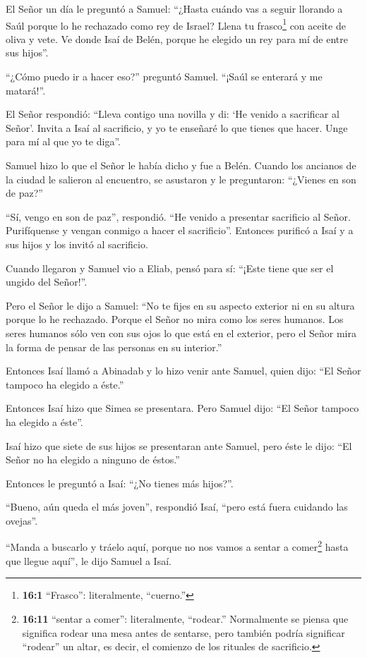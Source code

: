  El Señor un día le preguntó a Samuel: ``¿Hasta cuándo vas a
seguir llorando a Saúl porque lo he rechazado como rey de Israel? Llena
tu frasco\footnote{\textbf{16:1} ``Frasco'': literalmente, ``cuerno.''}
con aceite de oliva y vete. Ve donde Isaí de Belén, porque he elegido un
rey para mí de entre sus hijos''.

 ``¿Cómo puedo ir a hacer eso?'' preguntó Samuel. ``¡Saúl se
enterará y me matará!''.

El Señor respondió: ``Lleva contigo una novilla y di: `He venido a
sacrificar al Señor'.  Invita a Isaí al sacrificio, y yo te
enseñaré lo que tienes que hacer. Unge para mí al que yo te diga''.

 Samuel hizo lo que el Señor le había dicho y fue a Belén.
Cuando los ancianos de la ciudad le salieron al encuentro, se asustaron
y le preguntaron: ``¿Vienes en son de paz?''

 ``Sí, vengo en son de paz'', respondió. ``He venido a
presentar sacrificio al Señor. Purifíquense y vengan conmigo a hacer el
sacrificio''. Entonces purificó a Isaí y a sus hijos y los invitó al
sacrificio.

 Cuando llegaron y Samuel vio a Eliab, pensó para sí:
``¡Este tiene que ser el ungido del Señor!''.

 Pero el Señor le dijo a Samuel: ``No te fijes en su aspecto
exterior ni en su altura porque lo he rechazado. Porque el Señor no mira
como los seres humanos. Los seres humanos sólo ven con sus ojos lo que
está en el exterior, pero el Señor mira la forma de pensar de las
personas en su interior.''

 Entonces Isaí llamó a Abinadab y lo hizo venir ante Samuel,
quien dijo: ``El Señor tampoco ha elegido a éste.''

 Entonces Isaí hizo que Simea se presentara. Pero Samuel
dijo: ``El Señor tampoco ha elegido a éste''.

 Isaí hizo que siete de sus hijos se presentaran ante
Samuel, pero éste le dijo: ``El Señor no ha elegido a ninguno de
éstos.''

 Entonces le preguntó a Isaí: ``¿No tienes más hijos?''.

``Bueno, aún queda el más joven'', respondió Isaí, ``pero está fuera
cuidando las ovejas''.

``Manda a buscarlo y tráelo aquí, porque no nos vamos a sentar a
comer\footnote{\textbf{16:11} ``sentar a comer'': literalmente,
  ``rodear.'' Normalmente se piensa que significa rodear una mesa antes
  de sentarse, pero también podría significar ``rodear'' un altar, es
  decir, el comienzo de los rituales de sacrificio.} hasta que llegue
aquí'', le dijo Samuel a Isaí.

